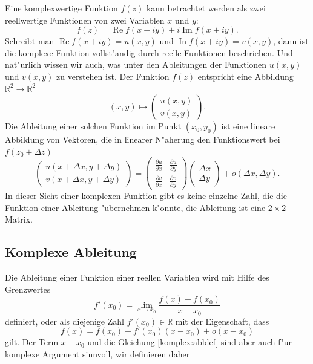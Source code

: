 Eine komplexwertige Funktion $f(z)$ kann betrachtet werden als zwei
reellwertige Funktionen von zwei Variablen $x$ und $y$:
\[
f(z)=\operatorname{Re}f(x+iy) + i \operatorname{Im}f(x+iy).
\]
Schreibt man
$\operatorname{Re}f(x+iy)=u(x,y)$
und
$\operatorname{In}f(x+iy)=v(x,y)$,
dann ist die komplexe Funktion vollst"andig durch reelle Funktionen
beschrieben.
Und nat"urlich wissen wir auch, was unter den Ableitungen der Funktionen 
$u(x,y)$ und $v(x,y)$ zu verstehen ist.
Der Funktion $f(z)$ entspricht eine Abbildung $\mathbb R^2\to\mathbb R^2$
%
\[
(x,y)\mapsto\begin{pmatrix}u(x,y)\\v(x,y)\end{pmatrix}.
\]
Die Ableitung einer solchen Funktion im Punkt $(x_0,y_0)$
ist eine lineare Abbildung von Vektoren, die in linearer N"aherung
den Funktionswert bei $f(z_0 + \Delta z)$ 
\[
\begin{pmatrix}
u(x+\Delta x, y +\Delta y)\\
v(x+\Delta x, y +\Delta y)
\end{pmatrix}
=
\begin{pmatrix}
\frac{\partial u}{\partial x}&\frac{\partial u}{\partial y}\\
\frac{\partial v}{\partial x}&\frac{\partial v}{\partial y}
\end{pmatrix}
\begin{pmatrix} \Delta x\\\Delta y \end{pmatrix}
+o(\Delta x, \Delta y).
\]
In dieser Sicht einer komplexen Funktion gibt es keine einzelne Zahl, die
die Funktion einer Ableitung "ubernehmen k"onnte, die Ableitung
ist eine $2\times 2$-Matrix.

%
%
\subsection{Komplexe Ableitung}
Die Ableitung einer Funktion einer reellen Variablen wird mit Hilfe des
Grenzwertes
\[
f'(x_0)=\lim_{x\to x_0}\frac{f(x)-f(x_0)}{x-x_0}
\]
definiert, oder als diejenige Zahl $f'(x_0)\in\mathbb R$ mit der Eigenschaft,
dass
\begin{equation}
f(x)=f(x_0)+f'(x_0)(x-x_0) + o(x-x_0)
\label{komplex:abldef}
\end{equation}
gilt.
Der Term $x-x_0$ und die Gleichung \eqref{komplex:abldef} sind aber auch
f"ur komplexe Argument sinnvoll, wir definieren daher

